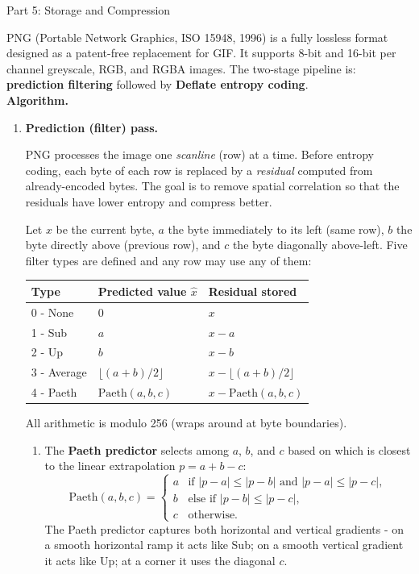 \documentclass[letterpaper]{article}
\begin{document}
\begin{notes}{Part 5: Storage and Compression}

PNG (Portable Network Graphics, ISO 15948, 1996) is a fully lossless format designed as a patent-free replacement for GIF. It supports 8-bit and 16-bit per channel greyscale, RGB, and RGBA images. The two-stage pipeline is: \textbf{prediction filtering} followed by \textbf{Deflate entropy coding}.\\


\textbf{Algorithm.}
\begin{enumerate}
    \item \textbf{Prediction (filter) pass.}

    PNG processes the image one \emph{scanline} (row) at a time. Before entropy coding, each byte of each row is replaced by a \emph{residual} computed from already-encoded bytes. The goal is to remove spatial correlation so that the residuals have lower entropy and compress better.
    
    Let $x$ be the current byte, $a$ the byte immediately to its left (same row), $b$ the byte directly above (previous row), and $c$ the byte diagonally above-left. Five filter types are defined and any row may use any of them:
    \begin{center}
    \begin{tabular}{@{}lll@{}}
    \toprule
    Type & Predicted value $\hat{x}$ & Residual stored \\
    \midrule
    0 - None   & $0$                  & $x$ \\
    1 - Sub    & $a$                  & $x - a$ \\
    2 - Up     & $b$                  & $x - b$ \\
    3 - Average & $\lfloor(a+b)/2\rfloor$ & $x - \lfloor(a+b)/2\rfloor$ \\
    4 - Paeth  & $\mathrm{Paeth}(a,b,c)$  & $x - \mathrm{Paeth}(a,b,c)$ \\
    \bottomrule
    \end{tabular}
    \end{center}
    All arithmetic is modulo 256 (wraps around at byte boundaries).

    \begin{enumerate}
        \item The \textbf{Paeth predictor} selects among $a$, $b$, and $c$ based on which is closest to the linear extrapolation $p = a + b - c$:
        $$\mathrm{Paeth}(a,b,c) = \begin{cases} a & \text{if } |p-a| \le |p-b| \text{ and } |p-a| \le |p-c|, \\ b & \text{else if } |p-b| \le |p-c|, \\ c & \text{otherwise.} \end{cases}$$
        The Paeth predictor captures both horizontal and vertical gradients - on a smooth horizontal ramp it acts like Sub; on a smooth vertical gradient it acts like Up; at a corner it uses the diagonal $c$.
        

\end{enumerate}
\end{enumerate}
\end{notes}
\end{document}
